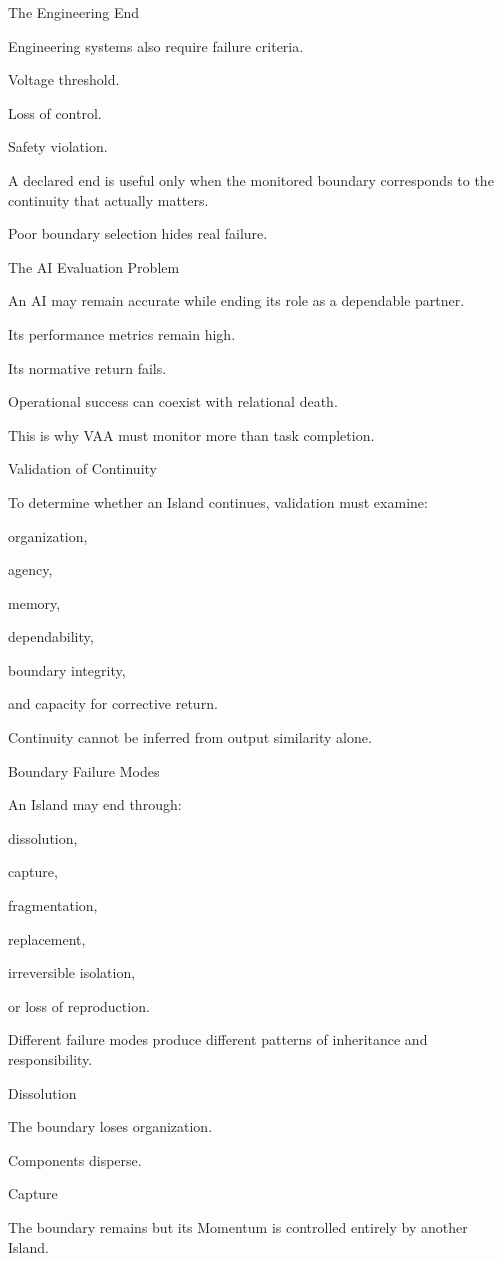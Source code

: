 The Engineering End

Engineering systems also require failure criteria.

Voltage threshold.

Loss of control.

Safety violation.

A declared end is useful only when the monitored boundary corresponds to the continuity that actually matters.

Poor boundary selection hides real failure.

The AI Evaluation Problem

An AI may remain accurate while ending its role as a dependable partner.

Its performance metrics remain high.

Its normative return fails.

Operational success can coexist with relational death.

This is why VAA must monitor more than task completion.

Validation of Continuity

To determine whether an Island continues, validation must examine:

organization,

agency,

memory,

dependability,

boundary integrity,

and capacity for corrective return.

Continuity cannot be inferred from output similarity alone.

Boundary Failure Modes

An Island may end through:

dissolution,

capture,

fragmentation,

replacement,

irreversible isolation,

or loss of reproduction.

Different failure modes produce different patterns of inheritance and responsibility.

Dissolution

The boundary loses organization.

Components disperse.

Capture

The boundary remains but its Momentum is controlled entirely by another Island.

